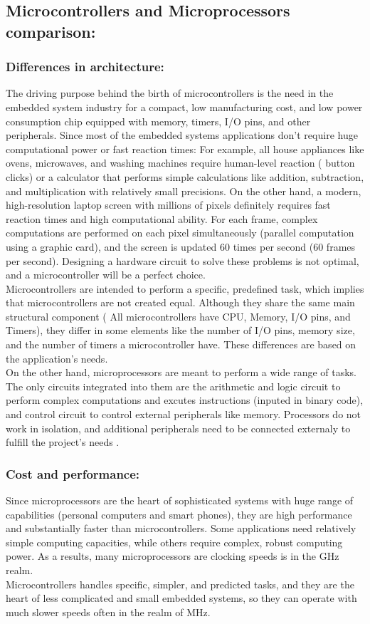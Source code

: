\documentclass[12pt]{article}
\begin{document}
\subsection{Microcontrollers and Microprocessors comparison:}
\subsubsection{Differences in architecture:}
The driving purpose behind the birth of microcontrollers is the need in the embedded system industry for a compact, low manufacturing cost, and low power consumption chip equipped with memory, timers, I/O pins, and other peripherals.
Since most of the embedded systems applications don't require huge computational power or fast reaction times: For example, all house appliances like ovens, microwaves, and washing machines require human-level reaction ( button clicks)  or a calculator that performs simple calculations like addition, subtraction, and multiplication with relatively small precisions.
On the other hand, a modern, high-resolution laptop screen with millions of pixels definitely requires fast reaction times and high computational ability.
For each frame, complex computations are performed on each pixel simultaneously (parallel computation using a graphic card), and the screen is updated 60 times per second (60 frames per second).
Designing a hardware circuit to solve these problems is not optimal, and a microcontroller will be a perfect choice.\\
Microcontrollers are intended to perform a specific, predefined task, which implies that microcontrollers are not created equal. Although they share the same main structural component ( All microcontrollers have CPU, Memory, I/O pins, and Timers),
they differ in some elements like the number of I/O pins, memory size, and the number of timers a microcontroller have.
These differences are based on the application's needs.\\
On the other hand, microprocessors are meant to perform a wide range of tasks. The only circuits integrated into them are the arithmetic and logic circuit to perform complex computations and excutes instructions (inputed in binary code), and control circuit to control external peripherals like memory.
Processors do not work in isolation, and additional peripherals need to be connected externaly to fulfill the project's needs .
\subsubsection{Cost and performance:}
Since microprocessors are the heart of sophisticated systems with huge range of capabilities (personal computers and smart phones), they are high performance and substantially faster than microcontrollers. Some applications need relatively simple computing capacities, while others require complex, robust computing power.
As a results, many microprocessors are clocking speeds is in the GHz realm.\\
Microcontrollers handles specific, simpler, and predicted tasks, and they are the heart of less complicated and small embedded systems, so they can operate with much slower speeds often in the realm of MHz.\\
\end{document}
